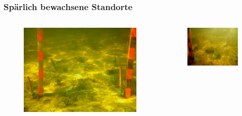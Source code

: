 \documentclass{beamer}
\begin{document}
\begin{frame}
\frametitle{Spärlich bewachsene Standorte}
\begin{columns}
\begin{column}{5.5cm}
\begin{figure}
\includegraphics[width=\textwidth]{images/plotpictures/Bsp_V-M}
\end{figure}
\end{column}
\begin{column}{5.5cm}
\begin{figure}
\includegraphics[width=\textwidth]{images/plotpictures/Bsp_G-M}
\end{figure}
\end{column}
\end{columns}
\end{frame}
\end{document}
